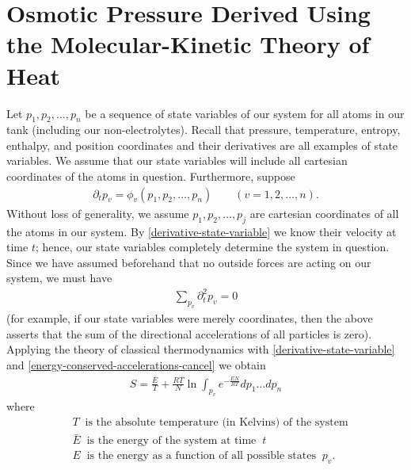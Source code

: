 \documentclass[12pt,reqno]{amsart}
\newcommand{\p}{\partial}
\theoremstyle{plain}  %
\theoremstyle{definition}
\begin{document}
\section{Osmotic Pressure Derived Using the Molecular-Kinetic Theory of Heat}
Let $p_1,p_2,\dots,p_n$ be a sequence of state variables of our system for all atoms
in our tank (including our non-electrolytes). Recall that pressure, temperature,
entropy, enthalpy, and position coordinates and their derivatives are
all examples of state variables. We assume that our state variables will
include all cartesian coordinates of the atoms in question. Furthermore, suppose 
\begin{equation}
	\begin{split}
		\p_t p_v = \phi_v(p_1,p_2,\dots,p_n) \qquad (v=1,2,\dots,n).
		\label{derivative-state-variable}
	\end{split}
\end{equation}
Without loss of generality, we assume $p_1,p_2,\dots,p_j$ are cartesian coordinates of
all the atoms in our system. By \eqref{derivative-state-variable} we know their
velocity at time $t$; hence, our state variables completely determine the system in
question. Since we have assumed beforehand that no outside forces are acting on our system, we must have 
\begin{equation}
	\begin{split}
		\sum_{p_v} \p_t^2 p_v = 0
		\label{energy-conserved-accelerations-cancel}
	\end{split}
\end{equation}
(for example, if our state variables were merely coordinates, then the above asserts
that the sum of the directional accelerations of all particles is zero). Applying the theory
of classical thermodynamics with \eqref{derivative-state-variable} and
\eqref{energy-conserved-accelerations-cancel} we obtain
\begin{equation*}
	\begin{split}
		S = \frac{\bar{E}}{T} + \frac{RT}{N}\ln \int_{p_v} e^{-\frac{EN}{RT}}dp_1\dots dp_n
		\label{entropy-equation}
	\end{split}
\end{equation*}
where 
\begin{equation*}
	\begin{split}
		& T \; \; \text{is the absolute temperature (in Kelvins) of the system}
		\\
		& \bar{E} \; \; \text{is the energy of the system at time} \; \; t
		\\
		& E \; \; \text{is the energy as a function of all possible states}
		\; \; p_v.
		\label{entropy-equation-defs}
	\end{split}
\end{equation*}
\end{document}
